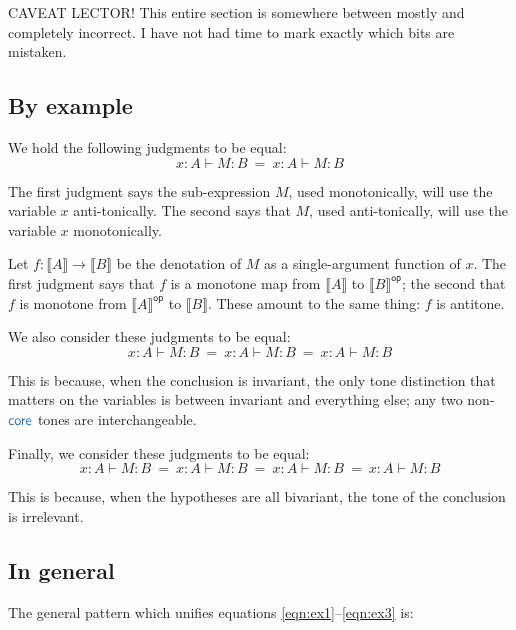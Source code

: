\documentclass{article}
\newcommand{\todo}[1]{{\color{red}#1}}
\newcommand{\ms}[1]{\ensuremath{\mathsf{#1}}}
\newcommand{\den}[1]{\llbracket{#1}\rrbracket}
\newcommand{\op}{\ms{op}}
\newcommand{\iso}{\ms{core}}
\renewcommand{\path}{\ms{path}}
\newcommand{\tm}{{\ms{id}}}     %
\newcommand{\ta}{{\color{ForestGreen}\ensuremath{\op}}}    %
\newcommand{\ti}{{\color{NavyBlue}\ensuremath{\iso}}} %
\newcommand{\tb}{{\color{Bittersweet}\ensuremath{\path}}}  %
\newcommand{\h}[3]{#1 : {#2}}
\newcommand{\hm}[2]{\h{#1}{#2}{\tm}}
\newcommand{\ha}[2]{\h{#1}{#2}{\ta}}
\newcommand{\hi}[2]{\h{#1}{#2}{\ti}}
\newcommand{\hb}[2]{\h{#1}{#2}{\tb}}
\begin{document}
\todo{CAVEAT LECTOR! This entire section is somewhere between mostly and
  completely incorrect. I have not had time to mark exactly which bits are
  mistaken. }

\subsection{By example}

We hold the following judgments to be equal:
\begin{equation}\label{eqn:ex1}
 \ha{x}{A} \vdash \hm{M}{B} ~=~ \hm{x}{A} \vdash \ha{M}{B}
\end{equation}

The first judgment says the sub-expression $M$, used monotonically, will use the
variable $x$ anti-tonically. The second says that $M$, used anti-tonically, will
use the variable $x$ monotonically.

Let $f : \den{A} \to \den{B}$ be the denotation of $M$ as a single-argument
function of $x$. The first judgment says that $f$ is a monotone map from
$\den{A}$ to $\den{B}^{\op}$; the second that $f$ is monotone from
$\den{A}^{\op}$ to $\den{B}$. These amount to the same thing: $f$ is
antitone.

We also consider these judgments to be equal:
\begin{equation}
  \hm{x}{A} \vdash \hi{M}{B}
  ~=~
  \ha{x}{A} \vdash \hi{M}{B}
  ~=~
  \hb{x}{A} \vdash \hi{M}{B}
\end{equation}

This is because, when the conclusion is invariant, the only tone distinction
that matters on the variables is between invariant and everything else; any two
non-$\ti$ tones are interchangeable.

Finally, we consider these judgments to be equal:
\begin{equation} \label{eqn:ex3}
  \hb{x}{A} \vdash \hb{M}{B}
  ~=~
  \hb{x}{A} \vdash \hm{M}{B}
  ~=~
  \hb{x}{A} \vdash \ha{M}{B}
  ~=~
  \hb{x}{A} \vdash \hi{M}{B}
\end{equation}

This is because, when the hypotheses are all bivariant, the tone of the
conclusion is irrelevant.

\subsection{In general}
The general pattern which unifies equations \ref{eqn:ex1}--\ref{eqn:ex3} is:
\end{document}
